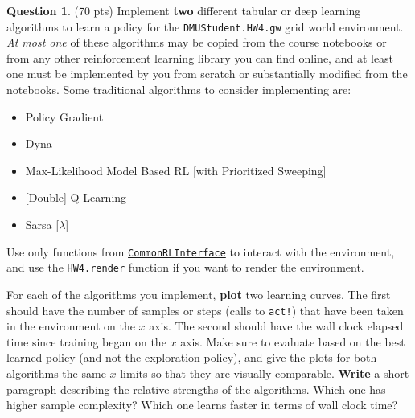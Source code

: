 \documentclass{article}
\theoremstyle{definition}
\newtheorem{question}[thm]{Question}
\begin{document}
\begin{question}
    (70 pts) Implement \textbf{two} different tabular or deep learning algorithms to learn a policy for the \texttt{DMUStudent.HW4.gw} grid world environment. \emph{At most one} of these algorithms may be copied from the course notebooks or from any other reinforcement learning library you can find online, and at least one must be implemented by you from scratch or substantially modified from the notebooks. Some traditional algorithms to consider implementing are:
    \begin{itemize}[noitemsep]
        \item Policy Gradient
        \item Dyna
        \item Max-Likelihood Model Based RL [with Prioritized Sweeping]
        \item{} [Double] Q-Learning
        \item Sarsa [$\lambda$]
    \end{itemize}
    Use only functions from \href{https://github.com/JuliaReinforcementLearning/CommonRLInterface.jl}{\texttt{CommonRLInterface}} to interact with the environment, and use the \texttt{HW4.render} function if you want to render the environment.

    For each of the algorithms you implement, \textbf{plot} two learning curves. The first should have the number of samples or steps (calls to \texttt{act!}) that have been taken in the environment on the $x$ axis. The second should have the wall clock elapsed time since training began on the $x$ axis. Make sure to evaluate based on the best learned policy (and not the exploration policy), and give the plots for both algorithms the same $x$ limits so that they are visually comparable. \textbf{Write} a short paragraph describing the relative strengths of the algorithms. Which one has higher sample complexity? Which one learns faster in terms of wall clock time?

\end{question}
\end{document}
